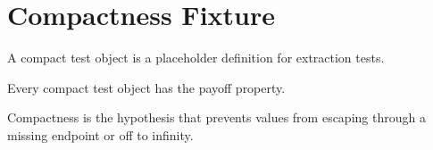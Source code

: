 \section{Compactness Fixture}

\begin{definition}
\label{def:compact-test-object}
A compact test object is a placeholder definition for extraction tests.
\end{definition}

\begin{theorem}
\label{thm:compactness-payoff}
Every compact test object has the payoff property.
\end{theorem}

\begin{remark*}[Exposition]
Compactness is the hypothesis that prevents values from escaping through a
missing endpoint or off to infinity.
\end{remark*}
